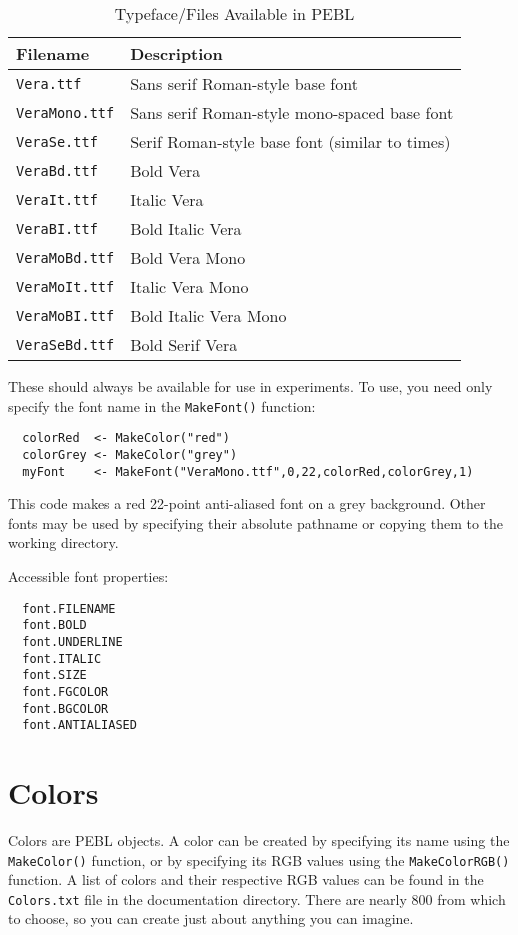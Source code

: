 \begin{table}[htbp]
\caption{Typeface/Files Available in PEBL}
\begin{tabular}{ll}
\toprule
\textbf{Filename}&\textbf{Description}\\
\midrule
\texttt{Vera.ttf}    &     Sans serif Roman-style base font\\
\texttt{VeraMono.ttf}&     Sans serif Roman-style mono-spaced base font\\
\texttt{VeraSe.ttf}  &     Serif Roman-style base font (similar to times)\\
\texttt{VeraBd.ttf}  &     Bold Vera\\
\texttt{VeraIt.ttf}  &     Italic Vera\\
\texttt{VeraBI.ttf}  &     Bold Italic Vera\\
\texttt{VeraMoBd.ttf}&     Bold Vera Mono\\
\texttt{VeraMoIt.ttf}&     Italic Vera Mono\\
\texttt{VeraMoBI.ttf}&     Bold Italic Vera Mono\\
\texttt{VeraSeBd.ttf}&     Bold Serif Vera\\
\bottomrule
\end{tabular}
\label{tab:fonts}
\end{table}



These should always be available for use in experiments. 
To use, you need only specify the font name in the \texttt{MakeFont()} function:
\begin{verbatim}
  colorRed  <- MakeColor("red")
  colorGrey <- MakeColor("grey")
  myFont    <- MakeFont("VeraMono.ttf",0,22,colorRed,colorGrey,1)
\end{verbatim}
This code makes a red 22-point anti-aliased font on a grey background. 
Other fonts may be used by specifying their absolute pathname 
or copying them to the working directory.


Accessible font properties:
\begin{verbatim}
  font.FILENAME
  font.BOLD
  font.UNDERLINE
  font.ITALIC
  font.SIZE
  font.FGCOLOR
  font.BGCOLOR
  font.ANTIALIASED
\end{verbatim}
 


\section{Colors} 

Colors are PEBL objects.  A color can be created by specifying its name 
using the \texttt{MakeColor()} function, or by specifying its RGB values using the \texttt{MakeColorRGB()} function. A list of colors and their respective RGB values can be found in the \texttt{Colors.txt} file in the documentation directory. There are nearly 800 from which to choose, so you can create 
just about anything you can imagine.

